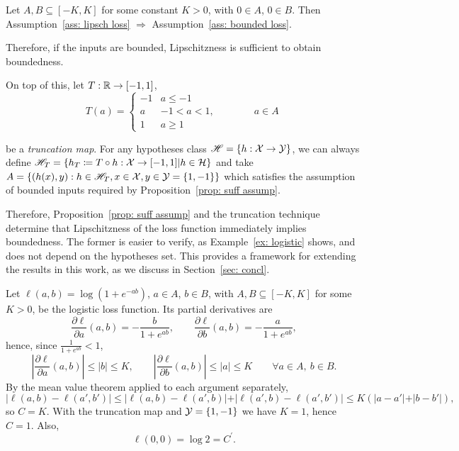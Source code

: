 \documentclass[reqno]{amsart}
\begin{document}
\begin{proposition}\label{prop: suff assump}
    Let $A,B\subseteq[-K,K]$ for some constant $K>0$, with $0\in A$, $0\in B$. Then Assumption~\ref{ass: lipsch loss} $\Rightarrow$ Assumption~\ref{ass: bounded loss}. 
\end{proposition}

Therefore, if the inputs are bounded, Lipschitzness is sufficient to obtain boundedness.

On top of this,
let $T:\mathbb{R}\to[-1,1]$,
\begin{equation}
    T(a) = \begin{cases}
        -1 & a \le -1\\
        a & -1<a<1, \qquad\qquad a\in A\\
        1 & a\ge 1
    \end{cases}
\end{equation}

be a {\it truncation map\/}. 
For any hypotheses class $\mathscr{H} = \{h:\mathcal{X}\to\mathcal{Y}\}$, we can always define $\mathscr{H}_T=\{ h_T\coloneq T\circ h : \mathcal{X}\to[-1,1] \vert h\in\mathcal{H}\}$ and take $A = \{(h(x),y) : h\in\mathscr{H}_T, x\in\mathcal{X}, y\in\mathcal{Y} = \{1,-1\}\}$ which satisfies the assumption of bounded inputs required by Proposition~\ref{prop: suff assump}. 

Therefore, Proposition~\ref{prop: suff assump} and the truncation technique determine that Lipschitzness of the loss function immediately implies boundedness. The former is easier to verify, as Example~\ref{ex: logistic} shows, and does not depend on the hypotheses set. This provides a framework for extending the results in this work, as we discuss in Section~\ref{sec: concl}.   

\begin{example}\label{ex: logistic}
    Let $\ell (a, b) = \log (1+e^{-ab})$, $a\in A$, $b\in B$, with $A,B\subseteq[-K,K]$ for some $K>0$, be the logistic loss function.
    Its partial derivatives are
    \[
    \frac{\partial \ell}{\partial a}(a,b) = -\frac{b}{1+e^{ab}}, \qquad \frac{\partial \ell}{\partial b}(a,b) = -\frac{a}{1+e^{ab}},
    \]
    hence, since $\frac{1}{1+e^{ab}}<1$,
    \[
    \left\vert \frac{\partial \ell}{\partial a}(a,b)\right\vert \le \vert b\vert \le K, \qquad \left\vert \frac{\partial \ell}{\partial b}(a,b)\right\vert \le \vert a\vert \le K \qquad \forall a\in A,\ b\in B.
    \]
    By the mean value theorem applied to each argument separately,
    \[
    \vert \ell(a,b)-\ell(a',b')\vert \le \vert \ell(a,b)-\ell(a',b)\vert + \vert \ell(a',b)-\ell(a',b')\vert \le K\left(\vert a-a'\vert + \vert b-b'\vert\right),
    \]
    so $C = K$. With the truncation map and $\mathcal{Y}=\{1,-1\}$ we have $K=1$, hence $C=1$.
    Also,
    \[
    \ell(0,0) = \log 2 = C^\prime.
    \]
\end{example}
\end{document}
